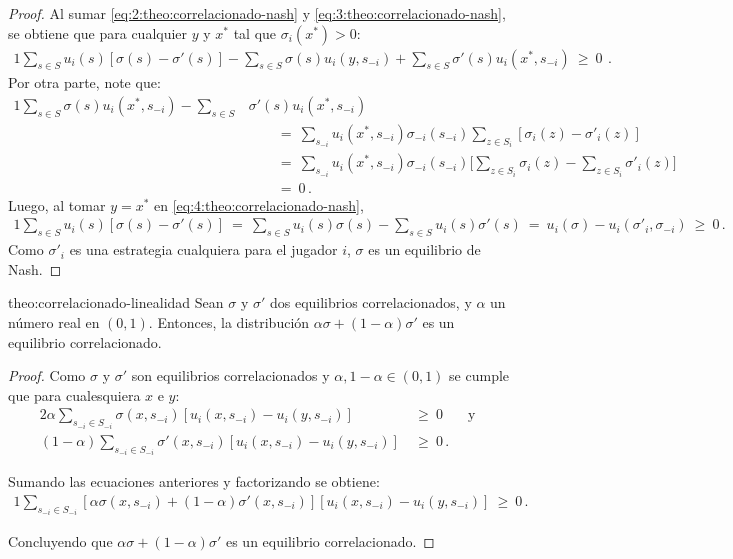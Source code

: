 \begin{proof}
Al sumar \eqref{eq:2:theo:correlacionado-nash} y
\eqref{eq:3:theo:correlacionado-nash}, se obtiene que para cualquier $y$ y $x^*$ tal que $\sigma_i(x^*)>0$:
\begin{alignat}{1}
\label{eq:4:theo:correlacionado-nash}
\sum_{s \in S} u_i(s) [\sigma(s) - \sigma'(s)] - \sum_{s \in S} \sigma(s)u_i(y, s_{-i}) + \sum_{s \in S} \sigma'(s) u_i(x^*, s_{-i})\ \geq\ 0\ \,.
\end{alignat}
Por otra parte, note que:
\begin{alignat}{1}
  \sum_{s \in S} \sigma(s) u_i(x^*,s_{-i}) - \sum_{s \in S} &\sigma'(s) u_i(x^*,s_{-i}) \\
    &\qquad=\ \sum_{s_{-i}} u_i(x^*,s_{-i}) \sigma_{-i}(s_{-i}) \sum_{z\in S_i} [\sigma_i(z) - \sigma'_i(z)] \\
    &\qquad=\ \sum_{s_{-i}} u_i(x^*,s_{-i}) \sigma_{-i}(s_{-i}) \biggl[ \sum_{z\in S_i} \sigma_i(z) - \sum_{z\in S_i} \sigma'_i(z) \biggr] \\
    &\qquad=\ 0 \,.
\end{alignat}
Luego, al tomar $y=x^*$ en \eqref{eq:4:theo:correlacionado-nash},
\begin{alignat}{1}
 \sum_{s \in S} u_i(s) [\sigma(s) - \sigma'(s)]\ =\ \sum_{s \in S} u_i(s)\sigma(s) - \sum_{s \in S} u_i(s)\sigma'(s)\ =\ u_i(\sigma) - u_i(\sigma'_i, \sigma_{-i})\ \geq\ 0 \,.
\end{alignat}
Como $\sigma'_i$ es una estrategia cualquiera para el jugador $i$, $\sigma$ es un equilibrio de Nash.
\end{proof}

\begin{reptheorem}{theo:correlacionado-linealidad}
Sean $\sigma$ y $\sigma'$ dos equilibrios correlacionados, y $\alpha$ un número real en $(0,1)$. Entonces, la distribución $\alpha\sigma + (1-\alpha)\sigma'$ es un equilibrio correlacionado.
\end{reptheorem}

\begin{proof}
Como $\sigma$ y $\sigma'$ son equilibrios correlacionados y $\alpha, 1 - \alpha \in (0, 1)$ se cumple que para cualesquiera $x$ e $y$:
\begin{alignat}{2}
 \alpha \sum_{s_{-i} \in S_{-i}} \sigma(x, s_{-i})[u_i(x, s_{-i}) - u_i(y, s_{-i})]\ & \geq\ 0 & \ \text{ y } \\
 (1 - \alpha) \sum_{s_{-i} \in S_{-i}} \sigma'(x, s_{-i})[u_i(x, s_{-i}) - u_i(y, s_{-i})]\ & \geq\ 0 \,.
\end{alignat}

Sumando las ecuaciones anteriores y factorizando se obtiene:
\begin{alignat}{1}
 \sum _{s_{-i} \in S_{-i}} [ \alpha \sigma(x, s_{-i}) +  (1 - \alpha) \sigma'(x, s_{-i})][u_i(x, s_{-i}) - u_i(y, s_{-i})]\ \geq\ 0 \,.
\end{alignat}

Concluyendo que $\alpha \sigma +  (1 - \alpha) \sigma'$ es un equilibrio correlacionado.
\end{proof}


